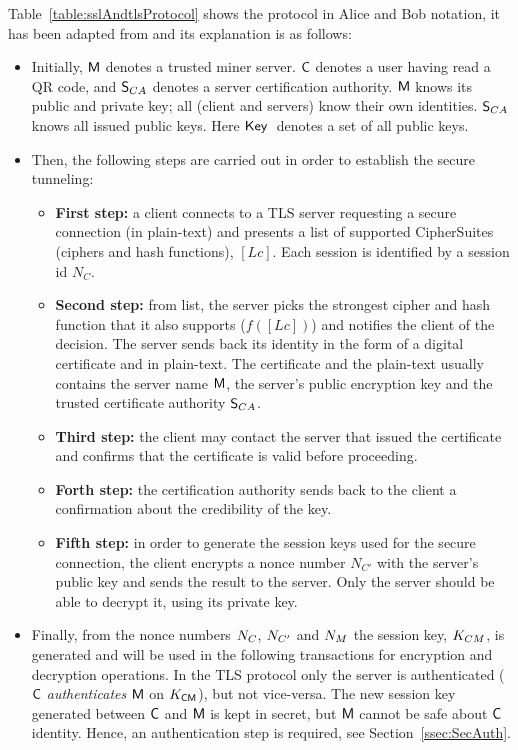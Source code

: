 Table~\ref{table:sslAndtlsProtocol} shows the protocol in Alice and Bob 
notation, it has been adapted from \cite{lopez13} and its explanation is as follows:

\begin{itemize}
  \item Initially, $\textsf{M}$ denotes a trusted miner server. $\textsf{C}$ denotes
    a user having read a QR code, and $\textsf{S}_{CA}$ denotes a server certification 
    authority. $\textsf{M}$ knows its public and private key; all (client and servers) 
    know their own identities. $\textsf{S}_{CA}$ knows all issued
    public keys. Here $\textsf{Key}\;$ denotes a set of all public keys.
  \item Then, the following steps are carried out in order to
    establish the secure tunneling:
    \begin{itemize}
    \item \textbf{First step:} a client connects to a TLS server
      requesting a secure connection (in plain-text) and presents a list
      of supported CipherSuites (ciphers and hash functions),
      $[Lc]$. Each session is identified by a session id $N_{C}$. 
    \item \textbf{Second step:} from list, the server picks the
      strongest cipher and hash function that it also supports
      ($f([Lc])$) and notifies the client of the decision. The server
      sends back its identity in the form of a digital certificate and
      in plain-text. The certificate and the plain-text usually contains
      the server name $\textsf{M}$, the server's public encryption
      key and the trusted certificate authority $\textsf{S}_{CA}$. 
    \item \textbf{Third step:} the client may contact the
      server that issued the certificate and confirms that the
      certificate is valid before proceeding.
    \item \textbf{Forth step:} the certification authority sends back to the 
      client a confirmation about the credibility of the key.
    \item \textbf{Fifth step:} in order to generate the session keys used for the
      secure connection, the client encrypts a nonce number $N_{C'}$
      with the server's public key and sends the result to the
      server. Only the server should be able to decrypt it, using its
      private key.  
    \end{itemize}
\item Finally, from the nonce numbers $N_{C}$, $N_{C'}$ and $N_{M}$
    the session key, $K_{CM}$, is generated and will be used  in the 
    following transactions for encryption and decryption operations.   
    In the TLS protocol only the server is authenticated ($\textsf{C}$ \textit{authenticates} $\textsf{M}$ on $K_{\textsf{C}\textsf{M}}$), but not vice-versa.
    The new session key generated between $\textsf{C}$ and $\textsf{M}$ is kept in secret, but $\textsf{M}$ cannot be safe about $\textsf{C}$ identity.
    Hence, an authentication step is required, see Section~\ref{ssec:SecAuth}.
\end{itemize}


